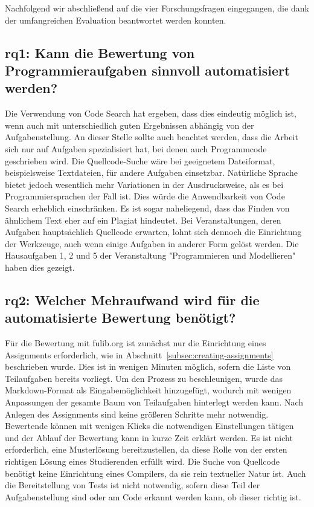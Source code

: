 Nachfolgend wir abschließend auf die vier Forschungsfragen eingegangen, die dank der umfangreichen Evaluation beantwortet werden konnten.

\subsection[\acs{rq}1]{\ac{rq}1: Kann die Bewertung von Programmieraufgaben sinnvoll automatisiert werden?}\label{subsec:ra1-useful-automation}

Die Verwendung von Code Search hat ergeben, dass dies eindeutig möglich ist, wenn auch mit unterschiedlich guten Ergebnissen abhängig von der Aufgabenstellung.
An dieser Stelle sollte auch beachtet werden, dass die Arbeit sich nur auf Aufgaben spezialisiert hat, bei denen auch Programmcode geschrieben wird.
Die Quellcode-Suche wäre bei geeignetem Dateiformat, beispielsweise Textdateien, für andere Aufgaben einsetzbar.
Natürliche Sprache bietet jedoch wesentlich mehr Variationen in der Ausdrucksweise, als es bei Programmiersprachen der Fall ist.
Dies würde die Anwendbarkeit von Code Search erheblich einschränken.
Es ist sogar naheliegend, dass das Finden von ähnlichem Text eher auf ein Plagiat hindeutet.
Bei Veranstaltungen, deren Aufgaben hauptsächlich Quellcode erwarten, lohnt sich dennoch die Einrichtung der Werkzeuge, auch wenn einige Aufgaben in anderer Form gelöst werden.
Die Hausaufgaben 1, 2 und 5 der Veranstaltung "Programmieren und Modellieren" haben dies gezeigt.

\subsection[\acs{rq}2]{\ac{rq}2: Welcher Mehraufwand wird für die automatisierte Bewertung benötigt?}\label{subsec:ra2-additional-effort}

Für die Bewertung mit fulib.org ist zunächst nur die Einrichtung eines Assignments erforderlich, wie in Abschnitt~\ref{subsec:creating-assignments} beschrieben wurde.
Dies ist in wenigen Minuten möglich, sofern die Liste von Teilaufgaben bereits vorliegt.
Um den Prozess zu beschleunigen, wurde das Markdown-Format als Eingabemöglichkeit hinzugefügt, wodurch mit wenigen Anpassungen der gesamte Baum von Teilaufgaben hinterlegt werden kann.
Nach Anlegen des Assignments sind keine größeren Schritte mehr notwendig.
Bewertende können mit wenigen Klicks die notwendigen Einstellungen tätigen und der Ablauf der Bewertung kann in kurze Zeit erklärt werden.
Es ist nicht erforderlich, eine Musterlösung bereitzustellen, da diese Rolle von der ersten richtigen Lösung eines Studierenden erfüllt wird.
Die Suche von Quellcode benötigt keine Einrichtung eines Compilers, da sie rein textueller Natur ist.
Auch die Bereitstellung von Tests ist nicht notwendig, sofern diese Teil der Aufgabenstellung sind oder am Code erkannt werden kann, ob dieser richtig ist.

